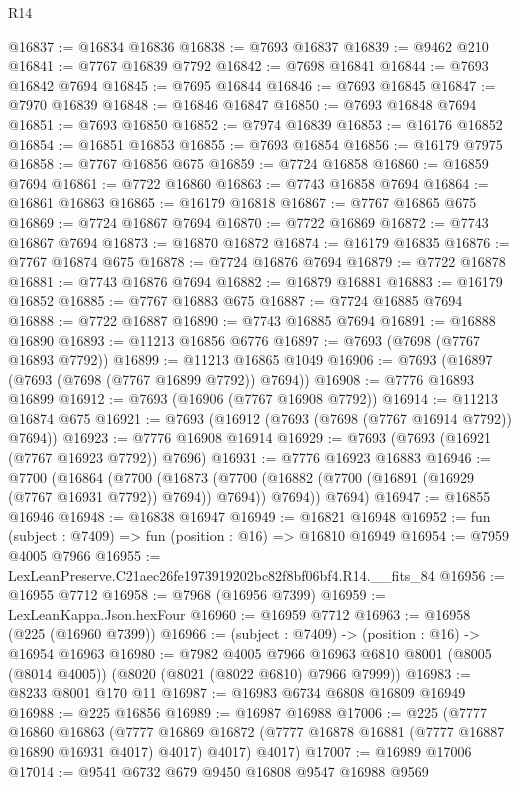 \begin{lexlean}{R14}
\begin{coremodule}
@16837 := @16834 @16836
@16838 := @7693 @16837
@16839 := @9462 @210
@16841 := @7767 @16839 @7792
@16842 := @7698 @16841
@16844 := @7693 @16842 @7694
@16845 := @7695 @16844
@16846 := @7693 @16845
@16847 := @7970 @16839
@16848 := @16846 @16847
@16850 := @7693 @16848 @7694
@16851 := @7693 @16850
@16852 := @7974 @16839
@16853 := @16176 @16852
@16854 := @16851 @16853
@16855 := @7693 @16854
@16856 := @16179 @7975
@16858 := @7767 @16856 @675
@16859 := @7724 @16858
@16860 := @16859 @7694
@16861 := @7722 @16860
@16863 := @7743 @16858 @7694
@16864 := @16861 @16863
@16865 := @16179 @16818
@16867 := @7767 @16865 @675
@16869 := @7724 @16867 @7694
@16870 := @7722 @16869
@16872 := @7743 @16867 @7694
@16873 := @16870 @16872
@16874 := @16179 @16835
@16876 := @7767 @16874 @675
@16878 := @7724 @16876 @7694
@16879 := @7722 @16878
@16881 := @7743 @16876 @7694
@16882 := @16879 @16881
@16883 := @16179 @16852
@16885 := @7767 @16883 @675
@16887 := @7724 @16885 @7694
@16888 := @7722 @16887
@16890 := @7743 @16885 @7694
@16891 := @16888 @16890
@16893 := @11213 @16856 @6776
@16897 := @7693 (@7698 (@7767 @16893 @7792))
@16899 := @11213 @16865 @1049
@16906 := @7693 (@16897 (@7693 (@7698 (@7767 @16899 @7792)) @7694))
@16908 := @7776 @16893 @16899
@16912 := @7693 (@16906 (@7767 @16908 @7792))
@16914 := @11213 @16874 @675
@16921 := @7693 (@16912 (@7693 (@7698 (@7767 @16914 @7792)) @7694))
@16923 := @7776 @16908 @16914
@16929 := @7693 (@7693 (@16921 (@7767 @16923 @7792)) @7696)
@16931 := @7776 @16923 @16883
@16946 := @7700
    (@16864
      (@7700
        (@16873 (@7700 (@16882 (@7700 (@16891 (@16929 (@7767 @16931 @7792)) @7694)) @7694)) @7694))
      @7694)
@16947 := @16855 @16946
@16948 := @16838 @16947
@16949 := @16821 @16948
@16952 := fun (subject : @7409) => fun (position : @16) => @16810 @16949
@16954 := @7959 @4005 @7966
@16955 := LexLeanPreserve.C21aec26fe1973919202bc82f8bf06bf4.R14.__fits_84
@16956 := @16955 @7712
@16958 := @7968 (@16956 @7399)
@16959 := LexLeanKappa.Json.hexFour
@16960 := @16959 @7712
@16963 := @16958 (@225 (@16960 @7399))
@16966 := (subject : @7409) -> (position : @16) -> @16954 @16963
@16980 := @7982
    @4005
    @7966
    @16963
    @6810
    @8001
    (@8005 (@8014 @4005))
    (@8020 (@8021 (@8022 @6810) @7966 @7999))
@16983 := @8233 @8001 @170 @11
@16987 := @16983 @6734 @6808 @16809 @16949
@16988 := @225 @16856
@16989 := @16987 @16988
@17006 := @225
    (@7777
      @16860
      @16863
      (@7777 @16869 @16872 (@7777 @16878 @16881 (@7777 @16887 @16890 @16931 @4017) @4017) @4017)
      @4017)
@17007 := @16989 @17006
@17014 := @9541 @6732 @679 @9450 @16808 @9547 @16988 @9569

\end{coremodule}
\end{lexlean}
